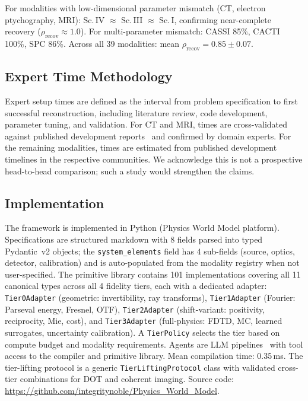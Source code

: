 \documentclass[11pt,a4paper]{article}
\begin{document}
For modalities with low-dimensional parameter mismatch (CT, electron ptychography, MRI): Sc.\,IV $\approx$ Sc.\,III $\approx$ Sc.\,I, confirming near-complete recovery ($\rho_{\text{recov}} \approx 1.0$).  For multi-parameter mismatch: CASSI 85\%, CACTI 100\%, SPC 86\%.  Across all 39 modalities: mean $\rho_{\text{recov}} = 0.85 \pm 0.07$.

\subsection{Expert Time Methodology}

Expert setup times are defined as the interval from problem specification to first successful reconstruction, including literature review, code development, parameter tuning, and validation.  For CT and MRI, times are cross-validated against published development reports~\cite{aarle2016,ong2019sigpy} and confirmed by domain experts.  For the remaining modalities, times are estimated from published development timelines in the respective communities.  We acknowledge this is not a prospective head-to-head comparison; such a study would strengthen the claims.

\subsection{Implementation}

The framework is implemented in Python (Physics World Model platform).  Specifications are structured markdown with 8 fields parsed into typed Pydantic~v2 objects; the \texttt{system\_elements} field has 4 sub-fields (source, optics, detector, calibration) and is auto-populated from the modality registry when not user-specified.  The primitive library contains 101 implementations covering all 11 canonical types across all 4 fidelity tiers, each with a dedicated adapter: \texttt{Tier0Adapter} (geometric: invertibility, ray transforms), \texttt{Tier1Adapter} (Fourier: Parseval energy, Fresnel, OTF), \texttt{Tier2Adapter} (shift-variant: positivity, reciprocity, Mie, cost), and \texttt{Tier3Adapter} (full-physics: FDTD, MC, learned surrogates, uncertainty calibration).  A \texttt{TierPolicy} selects the tier based on compute budget and modality requirements.  Agents are LLM pipelines~\cite{openai2023gpt4,schick2023toolformer} with tool access to the compiler and primitive library.  Mean compilation time: 0.35\,ms.  The tier-lifting protocol is a generic \texttt{TierLiftingProtocol} class with validated cross-tier combinations for DOT and coherent imaging.  Source code: \url{https://github.com/integritynoble/Physics_World_Model}.
\end{document}
